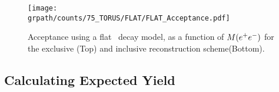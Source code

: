 \begin{figure}[h!]\begin{center}
 		\texttt{[image: \\grpath/counts/75\_TORUS/FLAT/FLAT\_Acceptance.pdf]}
 		\caption[Acceptance, as a function of $M(\epem)$]{\label{fig:FLATaccepted}{Acceptance using a flat \epemT \ decay model, as a function of $M(\epem)$ for the exclusive (Top) and inclusive reconstruction scheme(Bottom).}}
 \end{center}\end{figure} 
\FloatBarrier
\subsection{Calculating Expected Yield}
